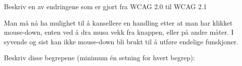 \documentclass{../../myassignment}
\begin{document}
	\begin{problem}
		Beskriv en av endringene som er gjort fra WCAG 2.0 til WCAG 2.1
	\end{problem}

	\begin{answer}
		Man må nå ha mulighet til å kansellere en handling etter at man har klikket mouse-down, enten ved å dra musa vekk fra knappen, eller på andre måter. I syvende og sist kan ikke mouse-down bli brukt til å utføre endelige funskjoner. 
		
	\end{answer}

	\newpage

	\begin{problem}
		Beskriv disse begrepene (minimum én setning for hvert begrep):
	\end{problem}
\end{document}
